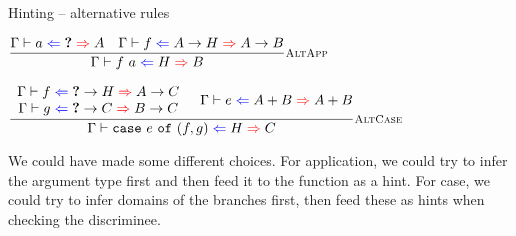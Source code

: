 \documentclass{beamer}
\begin{document}
\begin{frame}{Hinting -- alternative rules}

\begin{center}
  $\infrule[AltApp]{\hinting{a}{\Hole}{A} \quad \hinting{f}{\Fun{A}{H}}{\Fun{A}{B}}}{\hinting{\app{f}{a}}{H}{B}}$

  \vspace{2em}

  $\infrule[AltCase]{\begin{array}{c} \hinting{f}{\Fun{\Hole}{H}}{\Fun{A}{C}} \\ \hinting{g}{\Fun{\Hole}{C}}{\Fun{B}{C}} \end{array} \quad \hinting{e}{\Sum{A}{B}}{\Sum{A}{B}}}{\hinting{\case{e}{f}{g}}{H}{C}}$
\end{center}

\vspace{2em}

We could have made some different choices. For application, we could try to infer the argument type first and then feed it to the function as a hint. For case, we could try to infer domains of the branches first, then feed these as hints when checking the discriminee.

\end{frame}
\end{document}
